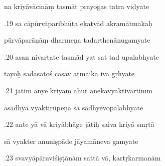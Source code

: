\documentclass[article,12pt,a4paper]{memoir}%
\newcounter{parCount}
\begin{document}
	  
	  \pstart \leavevmode%
	na kriyāvācināṃ tasmāt prayogas tatra vidyate 
	{}
	\pend%
      

	  
	  \pstart {}.19 sa cāpūrvāparibhūta ekatvād akramātmakaḥ 
	{}
	\pend%
      

	  
	  \pstart \leavevmode%
	pūrvāparāṇāṃ dharmeṇa tadarthenānugamyate 
	{}
	\pend%
      

	  
	  \pstart {}.20 asan nivartate tasmād yat sat tad upalabhyate 
	{}
	\pend%
      

	  
	  \pstart \leavevmode%
	tayoḥ sadasatoś cāsāv ātmaika iva gṛhyate 
	{}
	\pend%
      

	  
	  \pstart {}.21 jātim anye kriyām āhur anekavyaktivartinīm 
	{}
	\pend%
      

	  
	  \pstart \leavevmode%
	asādhyā vyaktirūpeṇa sā sādhyevopalabhyate 
	{}
	\pend%
      

	  
	  \pstart {}.22 ante yā vā kriyābhāge jātiḥ saiva kriyā smṛtā 
	{}
	\pend%
      

	  
	  \pstart \leavevmode%
	sā vyakter anuniṣpāde jāyamāneva gamyate 
	{}
	\pend%
      

	  
	  \pstart {}.23 svavyāpāraviśiṣṭānām sattā vā, kartṛkarmanām 
	{}
	\pend%
      
\end{document}

